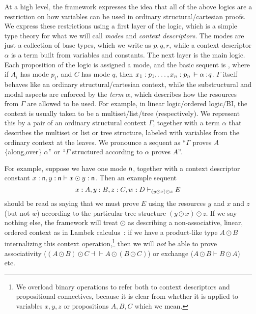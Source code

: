 At a high level, the framework expresses the idea that all of the above
logics are a restriction on how variables can be used in ordinary
structural/cartesian proofs.  We express these restrictions using a
first layer of the logic, which is a simple type theory for what we will
call \emph{modes} and \emph{context descriptors}.  The modes are just a
collection of base types, which we write as $p,q,r$, while a context
descriptor $\alpha$ is a term built from variables and constants.  The
next layer is the main logic.  Each proposition of the logic is assigned
a mode, and the basic sequent is , where if $A_i$ has mode $p_i$, and $C$ has mode $q$,
then $x_1 : p_1,\ldots, x_n : p_n \, \vdash \alpha \, \mathit{:} \, q$.
$\Gamma$ itself behaves like an ordinary structural/cartesian context,
while the substructural and modal aspects are enforced by the
\emph{term} $\alpha$, which describes how the resources from $\Gamma$
are allowed to be used.  For example, in linear logic/ordered logic/BI,
the context is usually taken to be a multiset/list/tree (respectively).
We represent this by a pair of an ordinary structural context $\Gamma$,
together with a term $\alpha$ that describes the multiset or list or
tree structure, labeled with variables from the ordinary context at the
leaves.  We pronounce a sequent  as ``$\Gamma$
proves $A$ \{along,over\} $\alpha$'' or ``$\Gamma$ structured according to
$\alpha$ proves $A$''.

For example, suppose we have one mode $\mathsf{n}$, together with a context
descriptor constant
$x : \mathsf{n}, y:\mathsf{n} \vdash x \odot y : \mathsf{n}$.  
Then an example sequent
\[
x:A, y:B, z:C, w:D \vdash_{(y \odot x) \odot z} E
\]
should be read as saying that we must prove $E$ using the resources $y$
and $x$ and $z$ (but not $w$) according to the particular tree structure
${(y \odot x) \odot z}$.  If we say nothing else, the framework will
treat $\odot$ as describing a non-associative, linear, ordered context
as in Lambek calculus~\citep{lambek58calculus}: if we have a
product-like type $A \odot B$ internalizing this context
operation,\footnote{We overload binary operations to refer both to
  context descriptors and propositional connectives, because it is clear
  from whether it is applied to variables $x,y,z$ or propositions
  $A,B,C$ which we mean.}  then we will \emph{not} be able to prove
associativity ($(A \odot B) \odot C \dashv\vdash A \odot (B \odot C)$)
or exchange ($A \odot B \vdash B \odot A$) etc.

